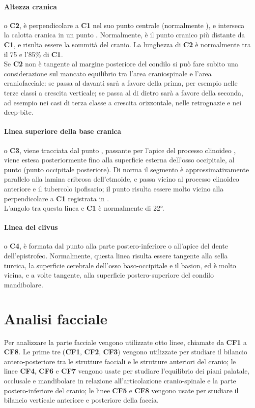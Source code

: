 \paragraph{Altezza cranica} o \textbf{C2}, è perpendicolare a \textbf{C1} nel suo punto centrale (normalmente ), e interseca la calotta cranica in un punto . Normalmente,  è il punto cranico più distante da \textbf{C1}, e  risulta essere la sommità del cranio. La lunghezza di \textbf{C2} è normalmente tra il 75 e l'85\% di \textbf{C1}.\\
Se \textbf{C2} non è tangente al margine posteriore del condilo si può fare subito una considerazione sul mancato equilibrio tra l'area craniospinale e l'area craniofacciale: se passa al davanti sarà a favore della prima, per esempio nelle terze classi a crescita verticale; se passa al di dietro sarà a favore della seconda, ad esempio nei casi di terza classe a crescita orizzontale, nelle retrognazie e nei deep-bite.

\paragraph{Linea superiore della base cranica} o \textbf{C3}, viene tracciata dal punto , passante per l'apice del processo clinoideo , viene estesa posteriormente fino alla superficie esterna dell'osso occipitale, al punto  (punto occipitale posteriore). Di norma il segmento  è approssimativamente parallelo alla lamina cribrosa dell'etmoide, e passa vicino al processo clinoideo anteriore e il tubercolo ipofisario; il punto  risulta essere molto vicino alla perpendicolare a \textbf{C1} registrata in .\\
L'angolo tra questa linea e \textbf{C1} è normalmente di 22°.

\paragraph{Linea del clivus} o \textbf{C4}, è formata dal punto  alla parte postero-inferiore o all'apice del dente dell'epistrofeo. Normalmente, questa linea risulta essere tangente alla sella turcica, la superficie cerebrale dell'osso baso-occipitale e il basion, ed è molto vicina, e a volte tangente, alla superficie postero-superiore del condilo mandibolare.

\section{Analisi facciale}
Per analizzare la parte facciale vengono utilizzate otto linee, chiamate da \textbf{CF1} a \textbf{CF8}. Le prime tre (\textbf{CF1}, \textbf{CF2}, \textbf{CF3}) vengono utilizzate per studiare il bilancio antero-posteriore tra le strutture facciali e le strutture anteriori del cranio; le linee \textbf{CF4}, \textbf{CF6} e \textbf{CF7} vengono usate per studiare l'equilibrio dei piani palatale, occlusale e mandibolare in relazione all'articolazione cranio-spinale e la parte postero-inferiore del cranio; le linee \textbf{CF5} e \textbf{CF8} vengono usate per studiare il bilancio verticale anteriore e posteriore della faccia.\\

